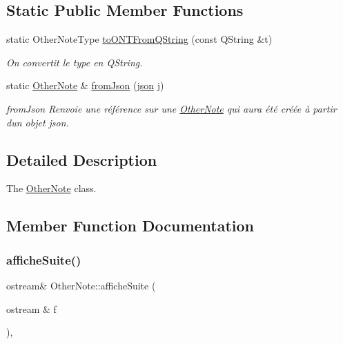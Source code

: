 \subsection*{Static Public Member Functions}
\begin{DoxyCompactItemize}
\item 
\mbox{\label{classOtherNote_aa49a05db8f3bdf80784e05716b1f939b}} 
static Other\+Note\+Type \hyperlink{classOtherNote_aa49a05db8f3bdf80784e05716b1f939b}{to\+O\+N\+T\+From\+Q\+String} (const Q\+String \&t)
\begin{DoxyCompactList}\small\item\em On convertit le type en Q\+String. \end{DoxyCompactList}\item 
static \hyperlink{classOtherNote}{Other\+Note} \& \hyperlink{classOtherNote_ab0a366aa561a511646c6ac3340fd1009}{from\+Json} (\hyperlink{classnlohmann_1_1basic__json}{json} j)
\begin{DoxyCompactList}\small\item\em from\+Json Renvoie une référence sur une \hyperlink{classOtherNote}{Other\+Note} qui aura été créée à partir d\textquotesingle{}un objet json. \end{DoxyCompactList}\end{DoxyCompactItemize}


\subsection{Detailed Description}
The \hyperlink{classOtherNote}{Other\+Note} class. 

\subsection{Member Function Documentation}
\mbox{\label{classOtherNote_acff4b0946c0ce0a4e15bad6cbb8ff13d}} 
\subsubsection{\texorpdfstring{affiche\+Suite()}{afficheSuite()}}
{\footnotesize\ttfamily ostream\& Other\+Note\+::affiche\+Suite (\begin{DoxyParamCaption}\item[{ostream \&}]{f }\end{DoxyParamCaption})\hspace{0.3cm}{\ttfamily [inline]}, {\ttfamily [virtual]}}



